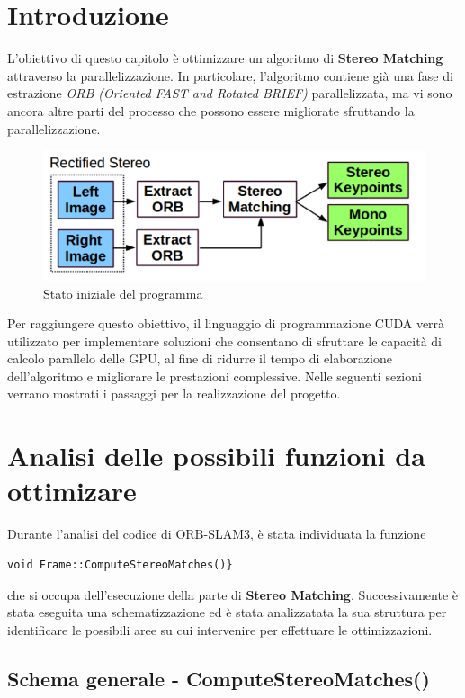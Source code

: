 \documentclass[12pt,a4paper]{report}
\begin{document}
\section{Introduzione}

L'obiettivo di questo capitolo è ottimizzare un algoritmo di \textbf{Stereo Matching} attraverso la parallelizzazione. In particolare, l'algoritmo contiene già una fase di estrazione \textit{ORB (Oriented FAST and Rotated BRIEF)} parallelizzata, ma vi sono ancora altre parti del processo che possono essere migliorate sfruttando la parallelizzazione.

\begin{figure}[h]
    \centering
    \includegraphics[width=0.7\linewidth]{img/start_point_opt.png}
    \caption{Stato iniziale del programma \cite{ORB_SLAM_2}}
\end{figure}


Per raggiungere questo obiettivo, il linguaggio di programmazione CUDA verrà utilizzato per implementare soluzioni che consentano di sfruttare le capacità di calcolo parallelo delle GPU, al fine di ridurre il tempo di elaborazione dell'algoritmo e migliorare le prestazioni complessive.
Nelle seguenti sezioni verrano mostrati i passaggi per la realizzazione del progetto.

\section{Analisi delle possibili funzioni da ottimizare}

Durante l'analisi del codice di ORB-SLAM3, è stata individuata la funzione 
\begin{lstlisting}
void Frame::ComputeStereoMatches()}
\end{lstlisting} 
che si occupa dell'esecuzione della parte di \textbf{Stereo Matching}. 
Successivamente è stata eseguita una schematizzazione ed è stata analizzatata la sua struttura per identificare le possibili aree su cui intervenire per effettuare le ottimizzazioni.

\subsection{Schema generale - ComputeStereoMatches() } \label{schema-generale-computeStereo}
\end{document}

